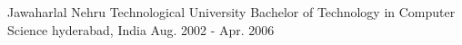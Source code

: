 \cventry
    {Jawaharlal Nehru Technological University} %
    {Bachelor of Technology in Computer Science} %
    {hyderabad, India} %
    {Aug. 2002 - Apr. 2006} %
    {
    }
